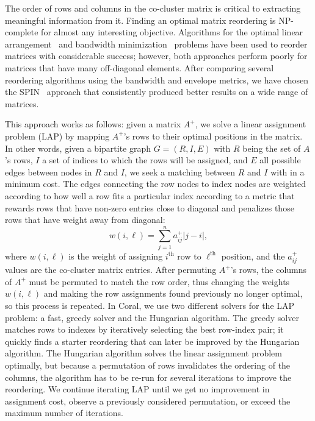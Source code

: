 \documentclass[12pt]{cmuthesis}
\newcommand\Coral{Coral\xspace}
\begin{document}
  The order of rows and columns in the co-cluster matrix is critical to extracting meaningful information from it. Finding an optimal matrix reordering is NP-complete for almost any interesting objective. Algorithms for the optimal linear arrangement~\cite{Mueller} and bandwidth minimization~\cite{Lai1982} problems have been used to reorder matrices with considerable success; however, both approaches perform poorly for matrices that have many off-diagonal elements. After comparing several reordering algorithms using the bandwidth and envelope metrics, we have chosen the SPIN~\cite{Tsafrir2005} approach that consistently produced better results on a wide range of matrices.

  This approach works as follows: given a matrix $A^{+}$, we solve a linear assignment problem (LAP) by mapping $A^{+}$'s rows to their optimal positions in the matrix. In other words, given a bipartite graph $G = (R, I, E)$ with $R$ being the set of $A$'s rows, $I$ a set of indices to which the rows will be assigned, and $E$ all possible edges between nodes in $R$ and $I$, we seek a matching between $R$ and $I$ with in a minimum cost. The edges connecting the row nodes to index nodes are weighted according to how well a row fits a particular index according to a metric that rewards rows that have non-zero entries close to diagonal and penalizes those rows that have weight away from diagonal:
  \[
  w(i, \ell) = \sum_{j=1}^{n} a^{+}_{ij} |j-i|,
  \]
  where $w(i, \ell)$ is the weight of assigning $i^{\textrm{th}}$ row to $\ell^{\textrm{th}}$ position, and the $a^{+}_{ij}$ values are the co-cluster matrix entries. After permuting $A^{+}$'s rows, the columns of $A^{+}$ must be permuted to match the row order, thus changing the weights $w(i,\ell)$ and making the row assignments found previously no longer optimal, so this process is repeated. In \Coral, we use two different solvers for the LAP problem: a fast, greedy solver and the Hungarian algorithm. The greedy solver matches rows to indexes by iteratively selecting the best row-index pair; it quickly finds a starter reordering that can later be improved by the Hungarian algorithm. The Hungarian algorithm solves the linear assignment problem optimally, but because a permutation of rows invalidates the ordering of the columns, the algorithm has to be re-run for several iterations to improve the reordering. We continue iterating LAP until we get no improvement in assignment cost, observe a previously considered permutation, or exceed the maximum number of iterations.
\end{document}

